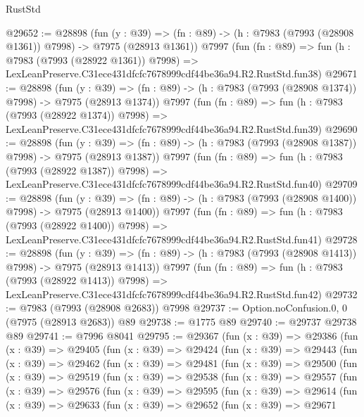 \begin{lexlean}{RustStd}
\begin{coremodule}
@29652 := @28898
    (fun (y : @39) =>
    (fn : @89) -> (h : @7983 (@7993 (@28908 @1361)) @7998) -> @7975 (@28913 @1361))
    @7997
    (fun (fn : @89) =>
    fun (h : @7983 (@7993 (@28922 @1361)) @7998) =>
    LexLeanPreserve.C31ece431dfcfc7678999cdf44be36a94.R2.RustStd.fun38)
@29671 := @28898
    (fun (y : @39) =>
    (fn : @89) -> (h : @7983 (@7993 (@28908 @1374)) @7998) -> @7975 (@28913 @1374))
    @7997
    (fun (fn : @89) =>
    fun (h : @7983 (@7993 (@28922 @1374)) @7998) =>
    LexLeanPreserve.C31ece431dfcfc7678999cdf44be36a94.R2.RustStd.fun39)
@29690 := @28898
    (fun (y : @39) =>
    (fn : @89) -> (h : @7983 (@7993 (@28908 @1387)) @7998) -> @7975 (@28913 @1387))
    @7997
    (fun (fn : @89) =>
    fun (h : @7983 (@7993 (@28922 @1387)) @7998) =>
    LexLeanPreserve.C31ece431dfcfc7678999cdf44be36a94.R2.RustStd.fun40)
@29709 := @28898
    (fun (y : @39) =>
    (fn : @89) -> (h : @7983 (@7993 (@28908 @1400)) @7998) -> @7975 (@28913 @1400))
    @7997
    (fun (fn : @89) =>
    fun (h : @7983 (@7993 (@28922 @1400)) @7998) =>
    LexLeanPreserve.C31ece431dfcfc7678999cdf44be36a94.R2.RustStd.fun41)
@29728 := @28898
    (fun (y : @39) =>
    (fn : @89) -> (h : @7983 (@7993 (@28908 @1413)) @7998) -> @7975 (@28913 @1413))
    @7997
    (fun (fn : @89) =>
    fun (h : @7983 (@7993 (@28922 @1413)) @7998) =>
    LexLeanPreserve.C31ece431dfcfc7678999cdf44be36a94.R2.RustStd.fun42)
@29732 := @7983 (@7993 (@28908 @2683)) @7998
@29737 := Option.noConfusion.{0, 0} (@7975 (@28913 @2683)) @89
@29738 := @1775 @89
@29740 := @29737 @29738 @89
@29741 := @7996 @8041
@29795 := @29367
    (fun (x : @39) =>
    @29386
      (fun (x : @39) =>
      @29405
        (fun (x : @39) =>
        @29424
          (fun (x : @39) =>
          @29443
            (fun (x : @39) =>
            @29462
              (fun (x : @39) =>
              @29481
                (fun (x : @39) =>
                @29500
                  (fun (x : @39) =>
                  @29519
                    (fun (x : @39) =>
                    @29538
                      (fun (x : @39) =>
                      @29557
                        (fun (x : @39) =>
                        @29576
                          (fun (x : @39) =>
                          @29595
                            (fun (x : @39) =>
                            @29614
                              (fun (x : @39) =>
                              @29633
                                (fun (x : @39) =>
                                @29652
                                  (fun (x : @39) =>
                                  @29671

\end{coremodule}
\end{lexlean}
